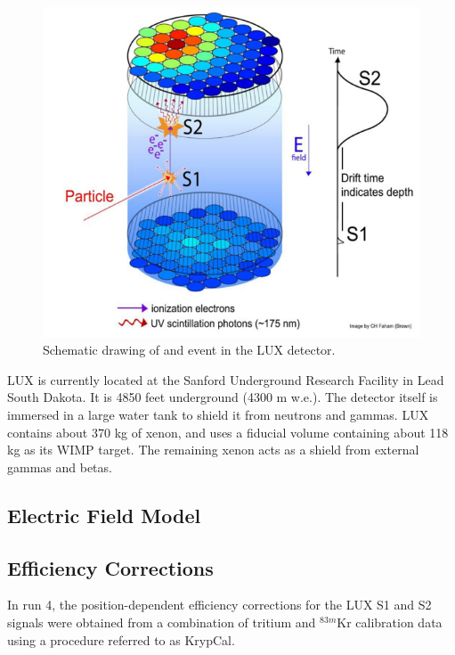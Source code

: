 \begin{figure}[h!]
\centering
\includegraphics[width=150mm]{Figures/luxevent.png}
\caption{Schematic drawing of and event in the LUX detector.\cite{lux2012}}
\label{fig:lux} 
\end{figure}

 LUX is currently located at the Sanford Underground Research Facility in Lead South Dakota. It is 4850 feet underground (4300 m w.e.). The detector itself is immersed in a large water tank to shield it from neutrons and gammas. LUX contains about 370 kg of xenon, and uses a fiducial volume containing about 118 kg as its WIMP target. The remaining xenon acts as a shield from external gammas and betas. 
 
 \subsection{Electric Field Model}
 \cite{lux_efield}
 
 
 \subsection{Efficiency Corrections}\label{sec:krypcal}
 In run 4, the position-dependent efficiency corrections for the LUX S1 and S2 signals were obtained from a combination of tritium and $^{83m}$Kr calibration data using a procedure referred to as KrypCal\cite{richard}.  
 
 
 